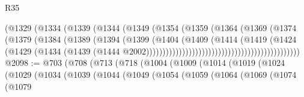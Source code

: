 \begin{lexlean}{R35}
\begin{coremodule}
                                                  (@1329
                                                    (@1334
                                                      (@1339
                                                        (@1344
                                                          (@1349
                                                            (@1354
                                                              (@1359
                                                                (@1364
                                                                  (@1369
                                                                    (@1374
                                                                      (@1379
                                                                        (@1384
                                                                          (@1389
                                                                            (@1394
                                                                              (@1399
                                                                                (@1404
                                                                                  (@1409
                                                                                    (@1414
                                                                                      (@1419
                                                                                        (@1424
                                                                                          (@1429
                                                                                            (@1434
                                                                                              (@1439
                                                                                                (@1444
                                                                                                  @2002)))))))))))))))))))))))))))))))))))))))))))))))
@2098 := @703
    (@708
      (@713
        (@718
          (@1004
            (@1009
              (@1014
                (@1019
                  (@1024
                    (@1029
                      (@1034
                        (@1039
                          (@1044
                            (@1049
                              (@1054
                                (@1059
                                  (@1064
                                    (@1069
                                      (@1074
                                        (@1079

\end{coremodule}
\end{lexlean}

